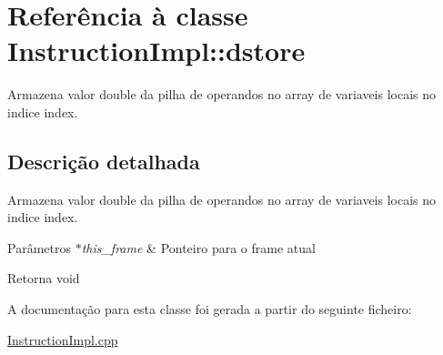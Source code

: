 \hypertarget{class_instruction_impl_1_1dstore}{}\section{Referência à classe Instruction\+Impl\+:\+:dstore}
\label{class_instruction_impl_1_1dstore}


Armazena valor double da pilha de operandos no array de variaveis locais no indice index.  




\subsection{Descrição detalhada}
Armazena valor double da pilha de operandos no array de variaveis locais no indice index. 


\begin{DoxyParams}{Parâmetros}
{\em $\ast$this\+\_\+frame} & Ponteiro para o frame atual \\
\hline
\end{DoxyParams}
\begin{DoxyReturn}{Retorna}
void 
\end{DoxyReturn}


A documentação para esta classe foi gerada a partir do seguinte ficheiro\+:\begin{DoxyCompactItemize}
\item 
\hyperlink{_instruction_impl_8cpp}{Instruction\+Impl.\+cpp}\end{DoxyCompactItemize}

